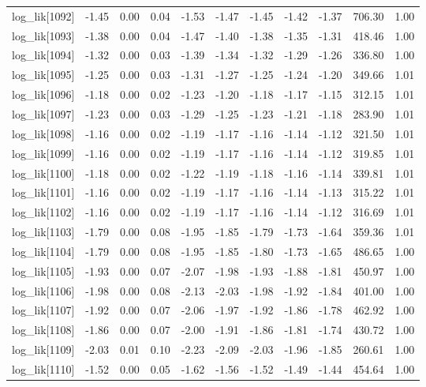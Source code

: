 \begin{table}[ht]
\begin{tabular}{rrrrrrrrrrr}
  log\_lik[1092] & -1.45 & 0.00 & 0.04 & -1.53 & -1.47 & -1.45 & -1.42 & -1.37 & 706.30 & 1.00 \\ 
  log\_lik[1093] & -1.38 & 0.00 & 0.04 & -1.47 & -1.40 & -1.38 & -1.35 & -1.31 & 418.46 & 1.00 \\ 
  log\_lik[1094] & -1.32 & 0.00 & 0.03 & -1.39 & -1.34 & -1.32 & -1.29 & -1.26 & 336.80 & 1.00 \\ 
  log\_lik[1095] & -1.25 & 0.00 & 0.03 & -1.31 & -1.27 & -1.25 & -1.24 & -1.20 & 349.66 & 1.01 \\ 
  log\_lik[1096] & -1.18 & 0.00 & 0.02 & -1.23 & -1.20 & -1.18 & -1.17 & -1.15 & 312.15 & 1.01 \\ 
  log\_lik[1097] & -1.23 & 0.00 & 0.03 & -1.29 & -1.25 & -1.23 & -1.21 & -1.18 & 283.90 & 1.01 \\ 
  log\_lik[1098] & -1.16 & 0.00 & 0.02 & -1.19 & -1.17 & -1.16 & -1.14 & -1.12 & 321.50 & 1.01 \\ 
  log\_lik[1099] & -1.16 & 0.00 & 0.02 & -1.19 & -1.17 & -1.16 & -1.14 & -1.12 & 319.85 & 1.01 \\ 
  log\_lik[1100] & -1.18 & 0.00 & 0.02 & -1.22 & -1.19 & -1.18 & -1.16 & -1.14 & 339.81 & 1.01 \\ 
  log\_lik[1101] & -1.16 & 0.00 & 0.02 & -1.19 & -1.17 & -1.16 & -1.14 & -1.13 & 315.22 & 1.01 \\ 
  log\_lik[1102] & -1.16 & 0.00 & 0.02 & -1.19 & -1.17 & -1.16 & -1.14 & -1.12 & 316.69 & 1.01 \\ 
  log\_lik[1103] & -1.79 & 0.00 & 0.08 & -1.95 & -1.85 & -1.79 & -1.73 & -1.64 & 359.36 & 1.01 \\ 
  log\_lik[1104] & -1.79 & 0.00 & 0.08 & -1.95 & -1.85 & -1.80 & -1.73 & -1.65 & 486.65 & 1.00 \\ 
  log\_lik[1105] & -1.93 & 0.00 & 0.07 & -2.07 & -1.98 & -1.93 & -1.88 & -1.81 & 450.97 & 1.00 \\ 
  log\_lik[1106] & -1.98 & 0.00 & 0.08 & -2.13 & -2.03 & -1.98 & -1.92 & -1.84 & 401.00 & 1.00 \\ 
  log\_lik[1107] & -1.92 & 0.00 & 0.07 & -2.06 & -1.97 & -1.92 & -1.86 & -1.78 & 462.92 & 1.00 \\ 
  log\_lik[1108] & -1.86 & 0.00 & 0.07 & -2.00 & -1.91 & -1.86 & -1.81 & -1.74 & 430.72 & 1.00 \\ 
  log\_lik[1109] & -2.03 & 0.01 & 0.10 & -2.23 & -2.09 & -2.03 & -1.96 & -1.85 & 260.61 & 1.00 \\ 
  log\_lik[1110] & -1.52 & 0.00 & 0.05 & -1.62 & -1.56 & -1.52 & -1.49 & -1.44 & 454.64 & 1.00 \\ 

\end{tabular}
\end{table}
